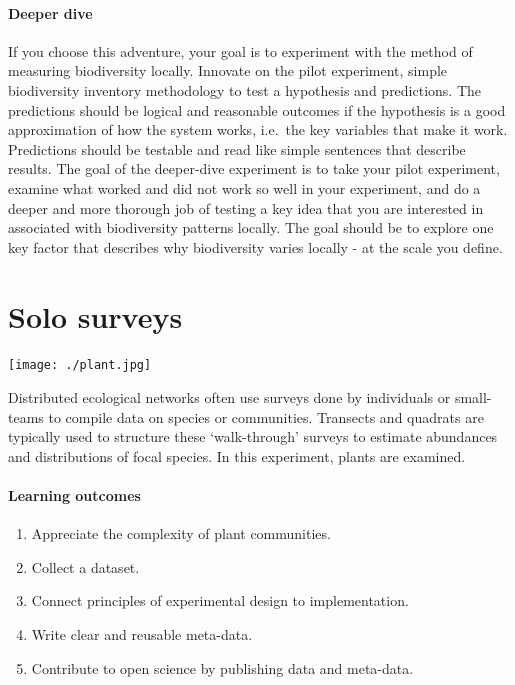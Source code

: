\documentclass[
]{book}
\providecommand{\tightlist}{%
  \setlength{\itemsep}{0pt}\setlength{\parskip}{0pt}}
\begin{document}
\hypertarget{deeper-dive-1}{%
\subsubsection*{Deeper dive}\label{deeper-dive-1}}

If you choose this adventure, your goal is to experiment with the method of measuring biodiversity locally. Innovate on the pilot experiment, simple biodiversity inventory methodology to test a hypothesis and predictions. The predictions should be logical and reasonable outcomes if the hypothesis is a good approximation of how the system works, i.e.~the key variables that make it work. Predictions should be testable and read like simple sentences that describe results. The goal of the deeper-dive experiment is to take your pilot experiment, examine what worked and did not work so well in your experiment, and do a deeper and more thorough job of testing a key idea that you are interested in associated with biodiversity patterns locally. The goal should be to explore one key factor that describes why biodiversity varies locally - at the scale you define.

\hypertarget{survey}{%
\chapter{Solo surveys}\label{survey}}

\texttt{[image: ./plant.jpg]}

Distributed ecological networks often use surveys done by individuals or small-teams to compile data on species or communities. Transects and quadrats are typically used to structure these `walk-through' surveys to estimate abundances and distributions of focal species. In this experiment, plants are examined.

\hypertarget{learning-outcomes-2}{%
\subsubsection*{Learning outcomes}\label{learning-outcomes-2}}

\begin{enumerate}
\def\labelenumi{\arabic{enumi}.}
\tightlist
\item
  Appreciate the complexity of plant communities.\\
\item
  Collect a dataset.\\
\item
  Connect principles of experimental design to implementation.\\
\item
  Write clear and reusable meta-data.\\
\item
  Contribute to open science by publishing data and meta-data.
\end{enumerate}
\end{document}
